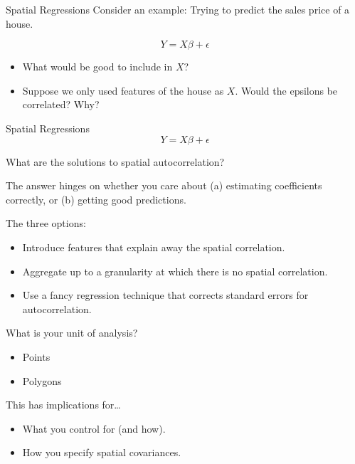 \documentclass[
  8pt,
  ignorenonframetext,
]{beamer}
\providecommand{\tightlist}{%
  \setlength{\itemsep}{0pt}\setlength{\parskip}{0pt}}
\begin{document}
\begin{frame}{Spatial Regressions}
\protect\hypertarget{spatial-regressions-1}{}
Consider an example: Trying to predict the sales price of a house.

\[Y = X\beta + \epsilon\]

\begin{itemize}
\tightlist
\item
  What would be good to include in \(X\)? \pause
\item
  Suppose we only used features of the house as \(X\). Would the
  epsilons be correlated? Why?
\end{itemize}
\end{frame}

\begin{frame}{Spatial Regressions}
\protect\hypertarget{spatial-regressions-2}{}
\[Y = X\beta + \epsilon\]

What are the solutions to spatial autocorrelation?

The answer hinges on whether you care about (a) estimating coefficients
correctly, or (b) getting good predictions.

The three options:

\begin{itemize}
\tightlist
\item
  Introduce features that explain away the spatial correlation.
\item
  Aggregate up to a granularity at which there is no spatial
  correlation.
\item
  Use a fancy regression technique that corrects standard errors for
  autocorrelation.
\end{itemize}
\end{frame}

\begin{frame}{What is your unit of analysis?}
\protect\hypertarget{what-is-your-unit-of-analysis}{}
\begin{itemize}
\tightlist
\item
  Points
\item
  Polygons
\end{itemize}

\pause

This has implications for\ldots{}

\begin{itemize}
\tightlist
\item
  What you control for (and how).
\item
  How you specify spatial covariances.
\end{itemize}
\end{frame}
\end{document}
